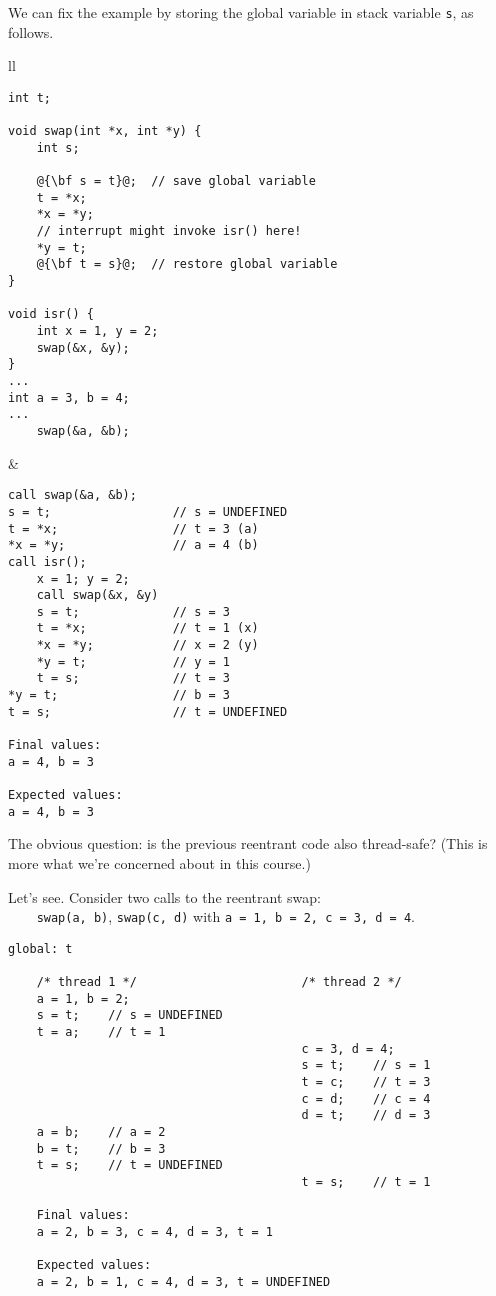 \documentclass[11pt]{article}
\begin{document}
\newpage
We can fix the example by storing the global variable in stack variable
{\tt s}, as follows.
\begin{center}
\begin{tabular}{ll}
\begin{minipage}{.5\textwidth}
  \begin{lstlisting}[escapechar=@,basicstyle=\scriptsize]
int t;
 
void swap(int *x, int *y) {
    int s;
 
    @{\bf s = t}@;  // save global variable
    t = *x;
    *x = *y;
    // interrupt might invoke isr() here!
    *y = t;
    @{\bf t = s}@;  // restore global variable
}
 
void isr() {
    int x = 1, y = 2;
    swap(&x, &y);
}
...
int a = 3, b = 4;
...
    swap(&a, &b);
  \end{lstlisting}
\end{minipage} &
\begin{minipage}{.5\textwidth}
  \begin{lstlisting}[basicstyle=\scriptsize]
call swap(&a, &b);
s = t;                 // s = UNDEFINED
t = *x;                // t = 3 (a)
*x = *y;               // a = 4 (b)
call isr();
    x = 1; y = 2;
    call swap(&x, &y)
    s = t;             // s = 3
    t = *x;            // t = 1 (x)
    *x = *y;           // x = 2 (y)
    *y = t;            // y = 1
    t = s;             // t = 3
*y = t;                // b = 3
t = s;                 // t = UNDEFINED

Final values:
a = 4, b = 3

Expected values:
a = 4, b = 3
  \end{lstlisting}
\end{minipage}
\end{tabular}
\end{center}

The obvious question: is the previous reentrant code also thread-safe?
(This is more what we're concerned about in this course.)

  Let's see. Consider two calls to the reentrant swap:\\ \verb+    swap(a, b)+, {\tt swap(c, d)} with {\tt a = 1, b = 2, c = 3, d = 4}.

  \begin{lstlisting}[basicstyle=\scriptsize]
    global: t

    /* thread 1 */                       /* thread 2 */
    a = 1, b = 2;
    s = t;    // s = UNDEFINED
    t = a;    // t = 1
                                         c = 3, d = 4;
                                         s = t;    // s = 1
                                         t = c;    // t = 3
                                         c = d;    // c = 4
                                         d = t;    // d = 3
    a = b;    // a = 2
    b = t;    // b = 3
    t = s;    // t = UNDEFINED
                                         t = s;    // t = 1

    Final values:
    a = 2, b = 3, c = 4, d = 3, t = 1

    Expected values:
    a = 2, b = 1, c = 4, d = 3, t = UNDEFINED
  \end{lstlisting}
\end{document}
